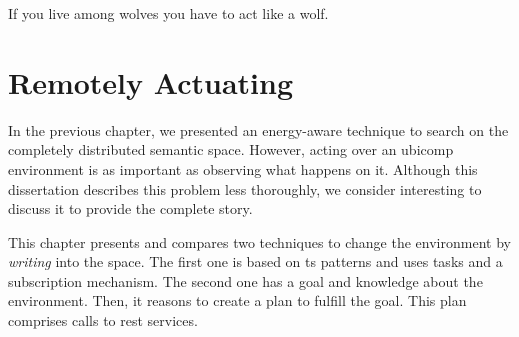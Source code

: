 
\begin{savequote}[50mm]
If you live among wolves you have to act like a wolf.
\end{savequote}


\chapter{Remotely Actuating}
\label{cha:actuate}


\newcommand{\restdesc}{\emph{RESTdesc}}



\ifpdf
    \graphicspath{{\pathchapsix/figures/PNG/}{\pathchapsix/figures/PDF/}{\pathchapsix/figures/JPG/}{\pathchapsix/figures/}}
\else
    \graphicspath{{\pathchapsix/figures/EPS/}{\pathchapsix/figures/}}
\fi



In the previous chapter, we presented an energy-aware technique to search on the completely distributed semantic space.
However, acting over an \ac{ubicomp} environment is as important as observing what happens on it. %
Although this dissertation describes this problem less thoroughly, we consider interesting to discuss it to provide the complete story. %

This chapter presents and compares two techniques to change the environment by \emph{writing} into the space. %
The first one is based on \ac{ts} patterns and uses tasks and a subscription mechanism.
The second one has a goal and knowledge about the environment.
Then, it reasons to create a plan to fulfill the goal.
This plan comprises calls to \ac{rest} services.







